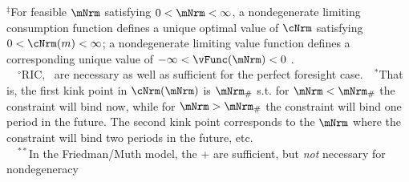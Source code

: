 \begin{table}
\settowidth\TableWidth{\usebox{\Required}}
\newlength{\RequiredShrunk}
\newsavebox{\RequiredShrunkBox}

\savebox{\RequiredShrunkBox}{
  \settowidth{\RequiredShrunk}{\usebox{\Required}}
  \resizebox{\textwidth}{!}{\begin{minipage}{\RequiredShrunk}
      \usebox{\Required}
    \end{minipage}}
}

\usebox{\RequiredShrunkBox}


\parbox{\textwidth}{\footnotesize         $^{\ddagger}$For feasible $\mNrm$ satisfying $0 < \mNrm < \infty$, a nondegenerate limiting consumption function defines a unique optimal value of $\cNrm$ satisfying $0 < \cNrm(m) < \infty$; a nondegenerate limiting value function defines a corresponding unique value of $-\infty < \vFunc(\mNrm) < 0$ .\\
  ~~$^{\circ}$RIC, \FHWC~are necessary as well as sufficient for the perfect foresight case.~~$^{\ast}$That is, the first kink point in $\cNrm(\mNrm)$ is $\mNrm_{\#}$ s.t. for $\mNrm < \mNrm_{\#}$ the constraint will bind now, while for $\mNrm > \mNrm_{\#}$ the constraint will bind one period in the future.  The second kink point corresponds to the $\mNrm$ where the constraint will bind two periods in the future, etc.\\
  ~~$^{\ast\ast}$In the Friedman/Muth model, the {\RIC}+{\FHWC} are sufficient, but \textit{not} necessary for nondegeneracy}
\end{table}

